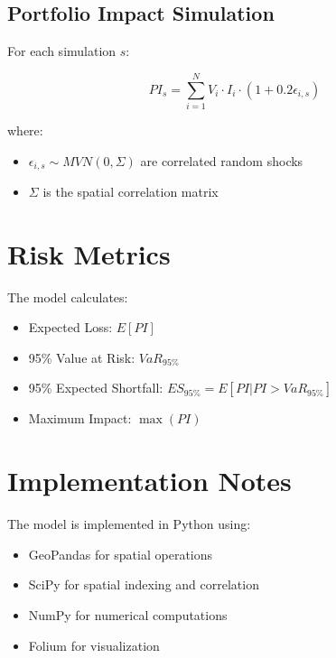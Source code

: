 \documentclass{article}
\begin{document}
\subsection{Portfolio Impact Simulation}
For each simulation $s$:

\begin{equation}
PI_s = \sum_{i=1}^{N} V_i \cdot I_i \cdot (1 + 0.2 \epsilon_{i,s})
\end{equation}

where:
\begin{itemize}
    \item $\epsilon_{i,s} \sim MVN(0, \Sigma)$ are correlated random shocks
    \item $\Sigma$ is the spatial correlation matrix
\end{itemize}

\section{Risk Metrics}
The model calculates:
\begin{itemize}
    \item Expected Loss: $E[PI]$
    \item 95\% Value at Risk: $VaR_{95\%}$
    \item 95\% Expected Shortfall: $ES_{95\%} = E[PI|PI > VaR_{95\%}]$
    \item Maximum Impact: $\max(PI)$
\end{itemize}

\section{Implementation Notes}
The model is implemented in Python using:
\begin{itemize}
    \item GeoPandas for spatial operations
    \item SciPy for spatial indexing and correlation
    \item NumPy for numerical computations
    \item Folium for visualization
\end{itemize}
\end{document}
